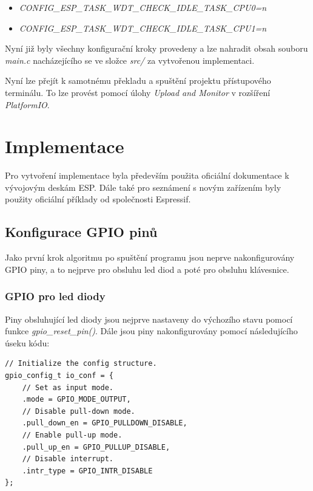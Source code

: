 \documentclass[a4paper, 12pt]{article}
\begin{document}
\begin{enumerate}[label=(\alph*)]
\begin{itemize}
            \begin{itemize}
                \item[] \textit{CONFIG\_ESP\_TASK\_WDT\_CHECK\_IDLE\_TASK\_CPU0=n}
                \item[] \textit{CONFIG\_ESP\_TASK\_WDT\_CHECK\_IDLE\_TASK\_CPU1=n}
            \end{itemize}
            
            Nyní již byly všechny konfigurační kroky provedeny a lze nahradit obsah souboru \textit{main.c} nacházejícího se ve složce \textit{src/} za vytvořenou implementaci.
        \end{itemize}    
\end{enumerate}

Nyní lze přejít k samotnému překladu a spuštění projektu přístupového terminálu. To lze provést pomocí úlohy \textit{Upload and Monitor} v rozšíření \textit{PlatformIO}.


\section{Implementace}
Pro vytvoření implementace byla především použita oficiální dokumentace k vývojovým deskám ESP\cite{espDoc}. Dále také pro seznámení s novým zařízením byly použity oficiální příklady od společnosti Espressif\cite{espExamples}.

\subsection{Konfigurace GPIO pinů}
Jako první krok algoritmu po spuštění programu jsou neprve nakonfigurovány GPIO piny, a to nejprve pro obsluhu led diod a poté pro obsluhu klávesnice.

\subsubsection*{GPIO pro led diody}
Piny obsluhující led diody jsou nejprve nastaveny do výchozího stavu pomocí funkce \textit{gpio\_reset\_pin()}. Dále jsou piny nakonfigurovány pomocí následujícího úseku kódu:

\begin{lstlisting}[style=CLanguage]
// Initialize the config structure.
gpio_config_t io_conf = {                
    // Set as input mode.
    .mode = GPIO_MODE_OUTPUT,
    // Disable pull-down mode.
    .pull_down_en = GPIO_PULLDOWN_DISABLE,
    // Enable pull-up mode.
    .pull_up_en = GPIO_PULLUP_DISABLE,
    // Disable interrupt.
    .intr_type = GPIO_INTR_DISABLE
};
\end{lstlisting}
\end{document}
